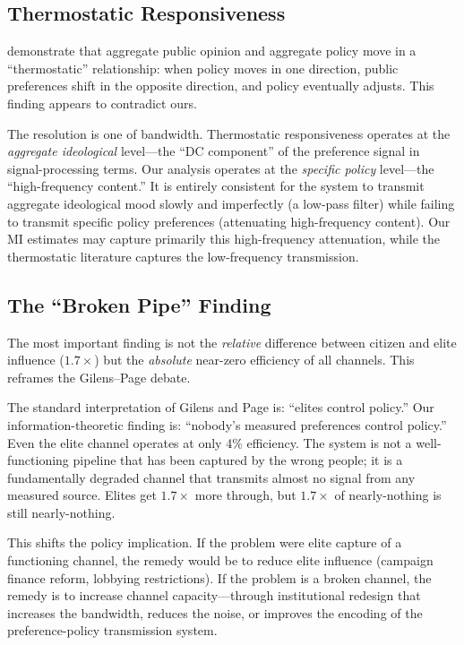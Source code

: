 \documentclass[twocolumn,10pt]{article}
\begin{document}
\subsection{Thermostatic Responsiveness}

\citet{soroka2010} demonstrate that aggregate public opinion and aggregate policy move in a ``thermostatic'' relationship: when policy moves in one direction, public preferences shift in the opposite direction, and policy eventually adjusts.  This finding appears to contradict ours.

The resolution is one of bandwidth.  Thermostatic responsiveness operates at the \emph{aggregate ideological} level---the ``DC component'' of the preference signal in signal-processing terms.  Our analysis operates at the \emph{specific policy} level---the ``high-frequency content.''  It is entirely consistent for the system to transmit aggregate ideological mood slowly and imperfectly (a low-pass filter) while failing to transmit specific policy preferences (attenuating high-frequency content).  Our MI estimates may capture primarily this high-frequency attenuation, while the thermostatic literature captures the low-frequency transmission.

\subsection{The ``Broken Pipe'' Finding}

The most important finding is not the \emph{relative} difference between citizen and elite influence ($1.7\times$) but the \emph{absolute} near-zero efficiency of all channels.  This reframes the Gilens--Page debate.

The standard interpretation of Gilens and Page is: ``elites control policy.''  Our information-theoretic finding is: ``nobody's measured preferences control policy.''  Even the elite channel operates at only 4\% efficiency.  The system is not a well-functioning pipeline that has been captured by the wrong people; it is a fundamentally degraded channel that transmits almost no signal from any measured source.  Elites get $1.7\times$ more through, but $1.7\times$ of nearly-nothing is still nearly-nothing.

This shifts the policy implication.  If the problem were elite capture of a functioning channel, the remedy would be to reduce elite influence (campaign finance reform, lobbying restrictions).  If the problem is a broken channel, the remedy is to increase channel capacity---through institutional redesign that increases the bandwidth, reduces the noise, or improves the encoding of the preference-policy transmission system.
\end{document}
